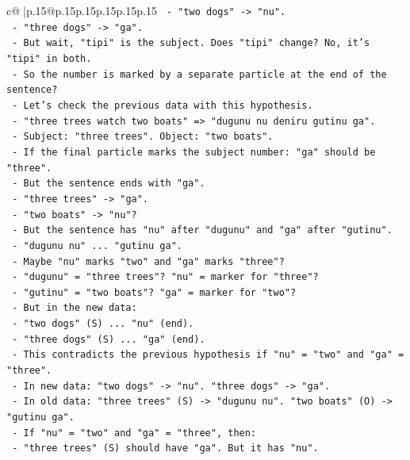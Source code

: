 \documentclass{article}
\begin{document}
{\begin{supertabular}{c@{$\;$}|p{.15\linewidth}@{}p{.15\linewidth}p{.15\linewidth}p{.15\linewidth}p{.15\linewidth}p{.15\linewidth}}
{{{\texttt{   {-} "two dogs" {-}> "nu".} \\
\texttt{   {-} "three dogs" {-}> "ga".} \\
\texttt{   {-} But wait, "tipi" is the subject. Does "tipi" change? No, it's "tipi" in both.} \\
\texttt{   {-} So the number is marked by a separate particle at the end of the sentence?} \\
\texttt{   {-} Let's check the previous data with this hypothesis.} \\
\texttt{   {-} "three trees watch two boats" => "dugunu nu deniru gutinu ga".} \\
\texttt{     {-} Subject: "three trees". Object: "two boats".} \\
\texttt{     {-} If the final particle marks the subject number: "ga" should be "three".} \\
\texttt{     {-} But the sentence ends with "ga".} \\
\texttt{     {-} "three trees" {-}> "ga".} \\
\texttt{     {-} "two boats" {-}> "nu"?} \\
\texttt{     {-} But the sentence has "nu" after "dugunu" and "ga" after "gutinu".} \\
\texttt{     {-} "dugunu nu" ... "gutinu ga".} \\
\texttt{     {-} Maybe "nu" marks "two" and "ga" marks "three"?} \\
\texttt{     {-} "dugunu" = "three trees"? "nu" = marker for "three"?} \\
\texttt{     {-} "gutinu" = "two boats"? "ga" = marker for "two"?} \\
\texttt{     {-} But in the new data:} \\
\texttt{       {-} "two dogs" (S) ... "nu" (end).} \\
\texttt{       {-} "three dogs" (S) ... "ga" (end).} \\
\texttt{       {-} This contradicts the previous hypothesis if "nu" = "two" and "ga" = "three".} \\
\texttt{       {-} In new data: "two dogs" {-}> "nu". "three dogs" {-}> "ga".} \\
\texttt{       {-} In old data: "three trees" (S) {-}> "dugunu nu". "two boats" (O) {-}> "gutinu ga".} \\
\texttt{       {-} If "nu" = "two" and "ga" = "three", then:} \\
\texttt{         {-} "three trees" (S) should have "ga". But it has "nu".} \\
}}}
\end{supertabular}}
\end{document}
